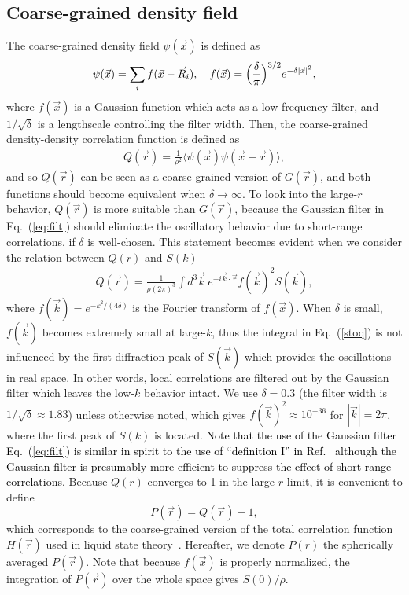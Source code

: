 \documentclass[aps,pre,twocolumn,superscriptaddress]{revtex4-1}
\newcommand{\be}{\begin{equation}}
\newcommand{\ee}{\end{equation}}
\newcommand{\red}[1]{\textcolor{black}{#1}}
\newcommand{\ave}[1]{\langle {#1} \rangle}
\begin{document}
\subsection{Coarse-grained density field}

The coarse-grained density field $\psi(\vec{x})$ is defined as 
\begin{eqnarray}
\psi(\vec{x}) = \sum_i f(\vec{x} - \vec{R}_i), \ \ \  
f(\vec{x}) = \Bigl( \frac{\delta}{\pi} \Bigr)^{3/2} e^{- \delta |\vec{x}|^2},
\label{eq:filt}
\end{eqnarray}
where $f(\vec{x})$ is a Gaussian function which acts as a 
low-frequency filter, 
and $1/\sqrt{\delta}$ is a lengthscale controlling the filter width. 
Then, the coarse-grained density-density correlation function is defined as 
\begin{eqnarray}
Q(\vec{r}) = \frac{1}{\rho^2} \ave{\psi(\vec{x}) \psi(\vec{x}+\vec{r})},  
\label{eq:qofr}
\end{eqnarray}
and so $Q(\vec{r})$ can be seen as a coarse-grained version of $G(\vec{r})$,
and both functions should become equivalent 
when $\delta \to \infty$. To look into the large-$r$ behavior, 
$Q(\vec{r})$ is more suitable than $G(\vec{r})$, 
because the Gaussian filter in Eq.~(\ref{eq:filt}) should eliminate the 
oscillatory behavior due to short-range correlations, 
if $\delta$ is well-chosen. This statement becomes 
evident when we consider the relation between $Q(r)$ and $S(k)$
\begin{eqnarray}
Q(\vec{r}) = \frac{1}{\rho (2\pi)^3} \int d^3\vec{k} 
\ e^{-i\vec{k} \cdot \vec{r}} f(\vec{k})^2 S(\vec{k}), \label{stoq}
\end{eqnarray}
where $f(\vec{k}) = e^{- k^2/(4\delta)}$ is the Fourier transform of $f(\vec{x})$. 
When $\delta$ is small, $f(\vec{k})$ becomes extremely small at large-$k$, 
thus the integral in Eq.~(\ref{stoq})
is not influenced by the first diffraction peak of 
$S(\vec{k})$ which provides the oscillations in real space. In other words, 
local correlations are filtered out by the Gaussian filter
which leaves the low-$k$ behavior intact.
We use $\delta = 0.3$ (the filter width is $1/\sqrt{\delta} 
\approx 1.83$) unless otherwise noted, 
which gives $f(\vec{k})^2 \approx 10^{-36}$ for $|\vec{k}|= 2\pi$, 
where the first peak of $S(k)$ is located.  
\red{Note that the use of the Gaussian filter Eq.~(\ref{eq:filt}) is similar 
in spirit to the use of ``definition I'' in Ref.~\cite{wu2015} although the Gaussian filter is presumably more efficient to suppress the effect of short-range correlations.}
Because $Q(r)$ converges to 1 in the large-$r$ limit, 
it is convenient to define 
\be
P(\vec{r}) = Q(\vec{r}) -1,
\ee
which corresponds to the coarse-grained version of the total 
correlation function $H(\vec{r})$ used in liquid state theory~\cite{hansen}. 
Hereafter, we denote $P(r)$ the spherically averaged $P(\vec{r})$. 
Note that because $f(\vec{x})$ is properly normalized,
the integration of $P(\vec{r})$ over the whole space gives $S(0)/\rho$.  
\end{document}
